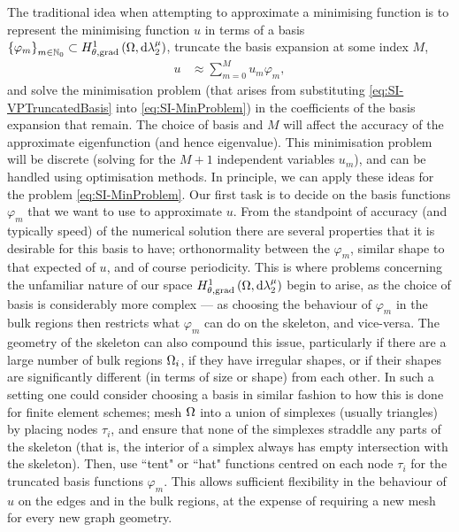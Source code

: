 The traditional idea when attempting to approximate a minimising function is to represent the minimising function $u$ in terms of a basis $\left\{ \varphi_m \right\}_{m\in\mathbb{N}_0}\subset H^1_{\theta, \mathrm{grad}}\left( \Omega, \mathrm{d}\lambda_2^{\mu} \right)$, truncate the basis expansion at some index $M$,
\begin{align} \label{eq:SI-VPTruncatedBasis}
	u &\approx \sum_{m=0}^M u_m \varphi_m,
\end{align}
and solve the minimisation problem (that arises from substituting \eqref{eq:SI-VPTruncatedBasis} into \eqref{eq:SI-MinProblem}) in the coefficients of the basis expansion that remain.
The choice of basis and $M$ will affect the accuracy of the approximate eigenfunction (and hence eigenvalue).
This minimisation problem will be discrete (solving for the $M+1$ independent variables $u_m$), and can be handled using optimisation methods.
In principle, we can apply these ideas for the problem \eqref{eq:SI-MinProblem}.
Our first task is to decide on the basis functions $\varphi_m$ that we want to use to approximate $u$.
From the standpoint of accuracy (and typically speed) of the numerical solution there are several properties that it is desirable for this basis to have; orthonormality between the $\varphi_m$, similar shape to that expected of $u$, and of course periodicity.
This is where problems concerning the unfamiliar nature of our space $H^1_{\theta, \mathrm{grad}}\left( \Omega, \mathrm{d}\lambda_2^{\mu} \right)$ begin to arise, as the choice of basis is considerably more complex --- as choosing the behaviour of $\varphi_m$ in the bulk regions then restricts what $\varphi_m$ can do on the skeleton, and vice-versa. 
The geometry of the skeleton can also compound this issue, particularly if there are a large number of bulk regions $\Omega_i$, if they have irregular shapes, or if their shapes are significantly different (in terms of size or shape) from each other.
In such a setting one could consider choosing a basis in similar fashion to how this is done for finite element schemes; mesh $\Omega$ into a union of simplexes (usually triangles) by placing nodes $\tau_i$, and  ensure that none of the simplexes straddle any parts of the skeleton (that is, the interior of a simplex always has empty intersection with the skeleton).
Then, use ``tent" or ``hat" functions centred on each node $\tau_i$ for the truncated basis functions $\varphi_m$.
This allows sufficient flexibility in the behaviour of $u$ on the edges and in the bulk regions, at the expense of requiring a new mesh for every new graph geometry.

